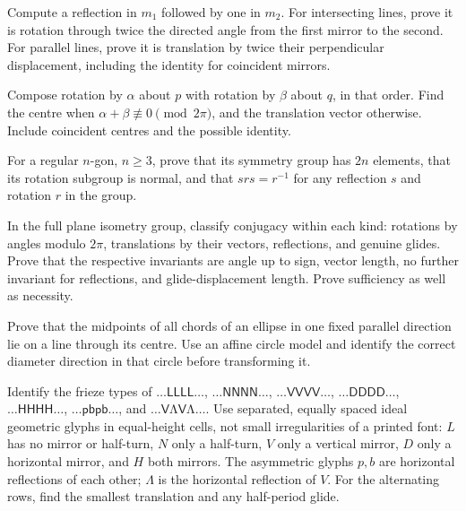 \begin{exercise}[$\star$]\label{geometry:ex:chasles}
Compute a reflection in $m_1$ followed by one in $m_2$. For intersecting lines, prove it is rotation through twice the directed angle from the first mirror to the second. For parallel lines, prove it is translation by twice their perpendicular displacement, including the identity for coincident mirrors.
\end{exercise}
\begin{exercise}[$\star$]\label{geometry:ex:tworotations}
Compose rotation by $\alpha$ about $p$ with rotation by $\beta$ about $q$, in that order. Find the centre when $\alpha+\beta\not\equiv0\pmod{2\pi}$, and the translation vector otherwise. Include coincident centres and the possible identity.
\end{exercise}
\begin{exercise}[$\star$]\label{geometry:ex:dihedral}
For a regular $n$-gon, $n\ge3$, prove that its symmetry group has $2n$ elements, that its rotation subgroup is normal, and that $srs=r^{-1}$ for any reflection $s$ and rotation $r$ in the group.
\end{exercise}
\begin{exercise}[$\star\star$]\label{geometry:ex:conjugacy}
In the full plane isometry group, classify conjugacy within each kind: rotations by angles modulo $2\pi$, translations by their vectors, reflections, and genuine glides. Prove that the respective invariants are angle up to sign, vector length, no further invariant for reflections, and glide-displacement length. Prove sufficiency as well as necessity.
\end{exercise}
\begin{exercise}[$\star$]\label{geometry:ex:affineellipse}
Prove that the midpoints of all chords of an ellipse in one fixed parallel direction lie on a line through its centre. Use an affine circle model and identify the correct diameter direction in that circle before transforming it.
\end{exercise}
\begin{exercise}[$\star$]\label{geometry:ex:friezeid}
Identify the frieze types of
$\dots\mathsf{LLLL}\dots$, $\dots\mathsf{NNNN}\dots$, $\dots\mathsf{VVVV}\dots$, $\dots\mathsf{DDDD}\dots$, $\dots\mathsf{HHHH}\dots$,
$\dots\mathsf{pbpb}\dots$, and $\dots\textsf{VΛVΛ}\dots$.
Use separated, equally spaced ideal geometric glyphs in equal-height cells, not small irregularities of a printed font: $L$ has no mirror or half-turn, $N$ only a half-turn, $V$ only a vertical mirror, $D$ only a horizontal mirror, and $H$ both mirrors. The asymmetric glyphs $p,b$ are horizontal reflections of each other; $\Lambda$ is the horizontal reflection of $V$. For the alternating rows, find the smallest translation and any half-period glide.
\end{exercise}
